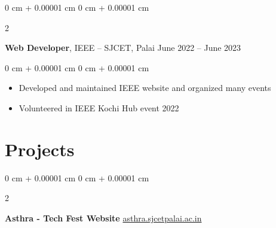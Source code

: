 \documentclass[10pt, letterpaper]{article}
\newenvironment{highlights}{
    \begin{itemize}[
        topsep=0.10 cm,
        parsep=0.10 cm,
        partopsep=0pt,
        itemsep=0pt,
        leftmargin=0 cm + 10pt
    ]
}{
    \end{itemize}
} %
\newenvironment{onecolentry}{
    \begin{adjustwidth}{
        0 cm + 0.00001 cm
    }{
        0 cm + 0.00001 cm
    }
}{
    \end{adjustwidth}
} %
\newenvironment{twocolentry}[2][]{
    \onecolentry
    \def\secondColumn{#2}
    \setcolumnwidth{\fill, 4.5 cm}
    \begin{paracol}{2}
}{
    \switchcolumn \raggedleft \secondColumn
    \end{paracol}
    \endonecolentry
} %
\begin{document}
\vspace{0.2 cm}

\begin{twocolentry}{
        June 2022 – June 2023
    }
    \textbf{Web Developer}, IEEE -- SJCET, Palai\end{twocolentry}

\vspace{0.10 cm}
\begin{onecolentry}
    \begin{highlights}
        \item Developed and maintained IEEE website and organized many events
        \item Volunteered in IEEE Kochi Hub event 2022
    \end{highlights}
\end{onecolentry}







\section{Projects}

\begin{twocolentry}{
        \href{https://asthra.sjcetpalai.ac.in}{asthra.sjcetpalai.ac.in}
    }
    \textbf{Asthra - Tech Fest Website}\end{twocolentry}
\end{document}
